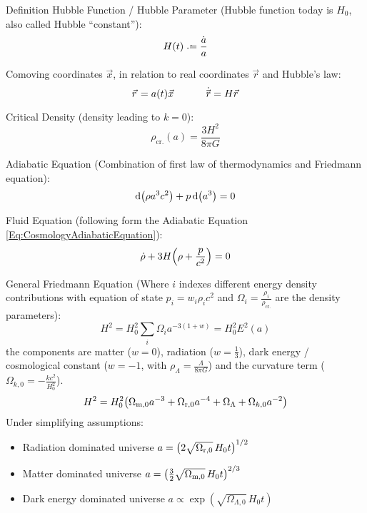 		\noindent
		Definition Hubble Function / Hubble Parameter{} (Hubble function today is $H_0$, also called Hubble ``constant''):
		\begin{equation}
			H(t) \defeq \frac{\dot{a}}{a}
		\end{equation}

		\noindent
		Comoving coordinates $\vec{x}$, in relation to real coordinates $\vec{r}$ and Hubble's law:
		\begin{equation}
			\vec{r} = a(t) \vec{x}
			\hsp
			\dot{\vec{r}} = H \vec{r}
		\end{equation}

		\noindent
		Critical Density (\ie density leading to $k=0$):
		\begin{equation}
			\rho_\text{cr.} (a) = \frac{3 H^2}{8 \pi G}
		\end{equation}

		\noindent
		Adiabatic Equation (Combination of first law of thermodynamics and Friedmann equation):
		\begin{equation}
			\label{Eq:CosmologyAdiabaticEquation}
			\dd \qty(\rho a^3 c^2) + p \dd (a^3) = 0
		\end{equation}

		\noindent
		Fluid Equation (following form the Adiabatic Equation \ref{Eq:CosmologyAdiabaticEquation}):
		\begin{equation}
			\dot{\rho} + 3 H \qty(\rho + \frac{p}{c^2}) = 0
		\end{equation}

		\noindent
		General Friedmann Equation (Where $i$ indexes different energy density contributions with equation of state $p_i = w_i \rho_i c^2$ and $\Omega_i = \frac{\rho_i}{\rho_\text{cr.}}$ are the density parameters):
		\begin{equation}
			H^2 = H_0^2\sum_i \Omega_i a^{-3(1+w)} = H_0^2 E^2(a)
		\end{equation}
		the components are matter ($w=0$), radiation ($w=\frac{1}{3}$), dark energy / cosmological constant ($w=-1$, with $\rho_\Lambda = \frac{\Lambda}{8\pi G}$) and the curvature term ($\Omega_{k,0}=-\frac{k c^2}{H_0^2}$).
		\begin{equation}
			H^2 = H_0^2 \qty(\Omega_{\text{m},0} a^{-3} + \Omega_{\text{r},0} a^{-4} + \Omega_{\Lambda} + \Omega_{k,0} a^{-2})
		\end{equation}
		Under simplifying assumptions:
		\begin{itemize}
			\item Radiation dominated universe $a = \qty(2\sqrt{\Omega_{\text{r},0}} \, H_0 t)^{1/2}$
			\item Matter dominated universe $a = \qty(\frac{3}{2}\sqrt{\Omega_{\text{m},0}} \, H_0 t)^{2/3}$
			\item Dark energy dominated universe $a \propto \exp(\sqrt{\Omega_{\Lambda,0}} \, H_0 t)$
		\end{itemize}

